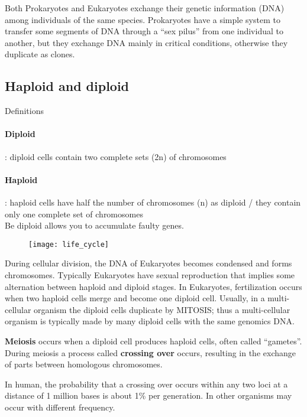 Both Prokaryotes and Eukaryotes exchange their genetic information (DNA)
among individuals of the same species. Prokaryotes have a simple system to
transfer some segments of DNA through a ``sex pilus'' from one individual to
another, but they exchange DNA mainly in critical conditions, otherwise they
duplicate as clones.

\subsection{Haploid and diploid}

Definitions

\paragraph*{Diploid}: diploid cells contain two complete sets (2n) of chromosomes

\paragraph*{Haploid}: haploid cells have half the number of chromosomes (n) as 
diploid / they contain only one complete set of chromosomes\\


Be diploid allows you to accumulate faulty genes.

\begin{figure}[H]
  \centering
  \texttt{[image: life\_cycle]}
\end{figure}

During cellular division, the DNA of Eukaryotes becomes condensed and forms
chromosomes. Typically Eukaryotes have sexual reproduction that implies some
alternation between haploid and diploid stages. In Eukaryotes, fertilization
occurs when two haploid cells merge and become one diploid cell. Usually, in a
multi-cellular organism the diploid cells duplicate by MITOSIS; thus a
multi-cellular organism is typically made by many diploid cells with the same
genomics DNA. 

\textbf{Meiosis} occurs when a diploid cell produces haploid cells, often
called ``gametes''. During meiosis a process called \textbf{crossing over}
occurs, resulting in the exchange of parts between homologous chromosomes. 

In human, the probability that a crossing over occurs within any two loci at 
a distance of 1 million bases is about 1\% per generation. 
In other organisms may occur with different frequency. 

